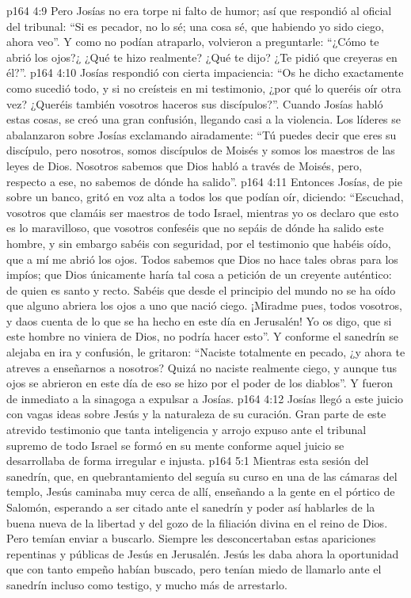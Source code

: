 \vs p164 4:9 Pero Josías no era torpe ni falto de humor; así que respondió al oficial del tribunal: “Si es pecador, no lo sé; una cosa sé, que habiendo yo sido ciego, ahora veo”. Y como no podían atraparlo, volvieron a preguntarle: “¿Cómo te abrió los ojos?¿ ¿Qué te hizo realmente? ¿Qué te dijo? ¿Te pidió que creyeras en él?”.
\vs p164 4:10 Josías respondió con cierta impaciencia: “Os he dicho exactamente como sucedió todo, y si no creísteis en mi testimonio, ¿por qué lo queréis oír otra vez? ¿Queréis también vosotros haceros sus discípulos?”. Cuando Josías habló estas cosas, se creó una gran confusión, llegando casi a la violencia. Los líderes se abalanzaron sobre Josías exclamando airadamente: “Tú puedes decir que eres su discípulo, pero nosotros, somos discípulos de Moisés y somos los maestros de las leyes de Dios. Nosotros sabemos que Dios habló a través de Moisés, pero, respecto a ese, no sabemos de dónde ha salido”.
\vs p164 4:11 Entonces Josías, de pie sobre un banco, gritó en voz alta a todos los que podían oír, diciendo: “Escuchad, vosotros que clamáis ser maestros de todo Israel, mientras yo os declaro que esto es lo maravilloso, que vosotros confeséis que no sepáis de dónde ha salido este hombre, y sin embargo sabéis con seguridad, por el testimonio que habéis oído, que a mí me abrió los ojos. Todos sabemos que Dios no hace tales obras para los impíos; que Dios únicamente haría tal cosa a petición de un creyente auténtico: de quien es santo y recto. Sabéis que desde el principio del mundo no se ha oído que alguno abriera los ojos a uno que nació ciego. ¡Miradme pues, todos vosotros, y daos cuenta de lo que se ha hecho en este día en Jerusalén! Yo os digo, que si este hombre no viniera de Dios, no podría hacer esto”. Y conforme el sanedrín se alejaba en ira y confusión, le gritaron: “Naciste totalmente en pecado, ¿y ahora te atreves a enseñarnos a nosotros? Quizá no naciste realmente ciego, y aunque tus ojos se abrieron en este día de  eso se hizo por el poder de los diablos”. Y fueron de inmediato a la sinagoga a expulsar a Josías.
\vs p164 4:12 Josías llegó a este juicio con vagas ideas sobre Jesús y la naturaleza de su curación. Gran parte de este atrevido testimonio que tanta inteligencia y arrojo expuso ante el tribunal supremo de todo Israel se formó en su mente conforme aquel juicio se desarrollaba de forma irregular e injusta.
\vs p164 5:1 Mientras esta sesión del sanedrín, que, en quebrantamiento del  seguía su curso en una de las cámaras del templo, Jesús caminaba muy cerca de allí, enseñando a la gente en el pórtico de Salomón, esperando a ser citado ante el sanedrín y poder así hablarles de la buena nueva de la libertad y del gozo de la filiación divina en el reino de Dios. Pero temían enviar a buscarlo. Siempre les desconcertaban estas apariciones repentinas y públicas de Jesús en Jerusalén. Jesús les daba ahora la oportunidad que con tanto empeño habían buscado, pero tenían miedo de llamarlo ante el sanedrín incluso como testigo, y mucho más de arrestarlo.
